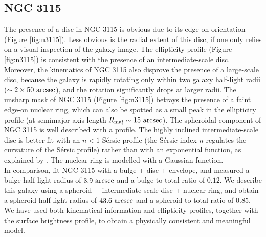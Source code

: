 \documentclass[useAMS,usenatbib,article]{mn2e}
\begin{document}
\subsection{NGC 3115}
The presence of a disc in NGC 3115 is obvious due to its edge-on orientation (Figure \ref{fig:n3115}). 
Less obvious is the radial extent of this disc, if one only relies on a visual inspection of the galaxy image. 
The ellipticity profile (Figure \ref{fig:n3115}) is consistent with the presence of an intermediate-scale disc. 
Moreover, the kinematics of NGC 3115 \citep{arnold2011n3115} also disprove the presence of a large-scale disc, 
because the galaxy is rapidly rotating only within two galaxy half-light radii ($\sim 2 \times 50~\rm arcsec$), 
and the rotation significantly drops at larger radii.  
The unsharp mask of NGC 3115 (Figure \ref{fig:n3115}) betrays the presence of a faint edge-on nuclear ring, 
which can also be spotted as a small peak in the ellipticity profile 
(at semimajor-axis length $R_{\rm maj} \sim 15~\rm arcsec$).
The spheroidal component of NGC 3115 is well described with a \cite{sersic1963} profile.
The highly inclined intermediate-scale disc is better fit with an $n<1$ S\'ersic profile 
(the S\'ersic index $n$ regulates the curvature of the S\'ersic profile) 
rather than with an exponential function, 
as explained by \cite{pastrav2013a}. 
The nuclear ring is modelled with a Gaussian function. \\
In comparison, \cite{lasker2014data} fit NGC 3115 with a bulge + disc + envelope, 
and measured a bulge half-light radius of $3.9~\rm arcsec$ and a bulge-to-total ratio of $0.12$. 
We describe this galaxy using a spheroid + intermediate-scale disc + nuclear ring, 
and obtain a spheroid half-light radius of $43.6~\rm arcsec$ and a spheroid-to-total ratio of $0.85$. 
We have used both kinematical information and ellipticity profiles, 
together with the surface brightness profile, 
to obtain a physically consistent and meaningful model. 
\end{document}
